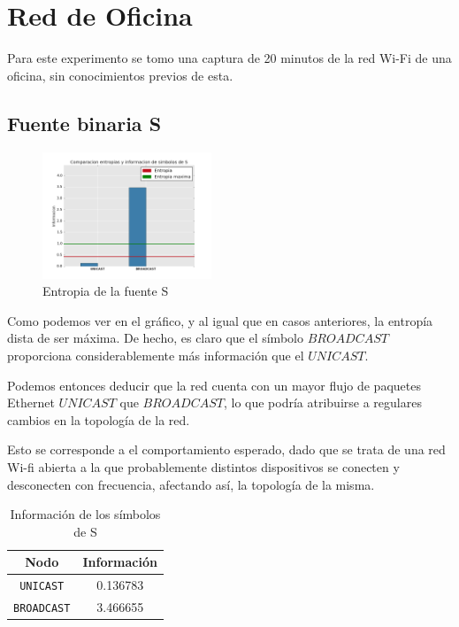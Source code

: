 \section{Red de Oficina}

Para este experimento se tomo una captura de 20 minutos de la red Wi-Fi de una oficina, sin conocimientos
previos de esta.

\subsection{Fuente binaria S}

\begin{figure}[H]
  \centering
    \includegraphics[width=0.45\textwidth]{agutter/gr1.png}
  \caption{Entropia de la fuente S}
  \label{entropia-s-agutter}
\end{figure}

Como podemos ver en el gráfico, y al igual que en casos anteriores, la entropía dista de ser máxima.
De hecho, es claro que el símbolo $BROADCAST$ proporciona considerablemente m\'as información que el
$UNICAST$. 

Podemos entonces deducir que la red cuenta con un mayor flujo de paquetes Ethernet $UNICAST$ que
$BROADCAST$, lo que podría atribuirse a regulares cambios en la topología de la red.

Esto se corresponde a el comportamiento esperado, dado que se trata de una red Wi-fi abierta a la que
probablemente distintos dispositivos se conecten y desconecten con frecuencia, afectando as\'i, la
topolog\'ia de la misma.

\begin{table}[H]\begin{center} %
  \begin{tabular}{|c|c|}
    \hline
    \textbf{Nodo} & \textbf{Información} \\ \hline
    \texttt{UNICAST}& 0.136783 \\ \hline
    \texttt{BROADCAST}& 3.466655 \\ \hline
  \end{tabular}
  \caption{Información de los símbolos de S}
  \label{info-simbolos-agutter}
\end{center}\end{table}

